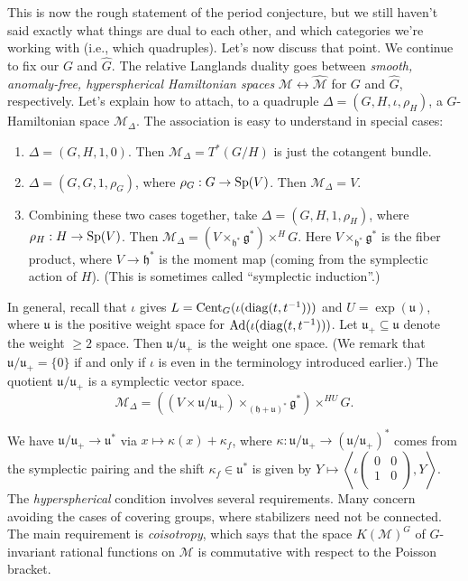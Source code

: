 \documentclass[reqno]{amsart} 
\numberwithin{theorem}{section}
\numberwithin{equation}{section}
\numberwithin{exercise}{section}
\begin{document}
This is now the rough statement of the period conjecture, but we still haven't said exactly what things are dual to each other, and which categories we're working with (i.e., which quadruples).  Let's now discuss that point.  We continue to fix our $G$ and $\hat{G}$.  The relative Langlands duality goes between \emph{smooth, anomaly-free, hyperspherical Hamiltonian spaces} $\mathcal{M} \leftrightarrow \hat{\mathcal{M}}$ for $G$ and $\hat{G}$, respectively.  Let's explain how to attach, to a quadruple $\Delta =(G, H, \iota, \rho_H)$, a $G$-Hamiltonian space $\mathcal{M}_\Delta$.  The association is easy to understand in special cases:
\begin{enumerate}
\item $\Delta =(G, H, 1, 0)$.  Then $\mathcal{M}_\Delta = T^\ast(G / H)$ is just the cotangent bundle.
\item $\Delta =(G, G, 1, \rho_G)$, where $\rho_G : G \rightarrow \operatorname{Sp}(V)$.  Then $\mathcal{M}_\Delta = V$.
\item Combining these two cases together, take $\Delta =(G, H, 1, \rho_H)$, where $\rho_H : H \rightarrow \operatorname{Sp}(V)$.  Then $\mathcal{M}_\Delta =(V \times_{\mathfrak{h}^\ast} \mathfrak{g}^\ast) \times^H G$.  Here $V \times_{\mathfrak{h}^\ast} \mathfrak{g}^\ast$ is the fiber product, where $V \rightarrow \mathfrak{h}^\ast$ is the moment map (coming from the symplectic action of $H$).  (This is sometimes called ``symplectic induction''.)
\end{enumerate}
In general, recall that $\iota$ gives $L = \operatorname{Cent}_G(\iota(\operatorname{diag}(t, t^{-1})))$ and $U = \exp(\mathfrak{u})$, where $\mathfrak{u}$ is the positive weight space for $\operatorname{Ad}(\iota(\operatorname{diag}(t, t^{-1})))$.  Let $\mathfrak{u}_+ \subseteq \mathfrak{u}$ denote the weight $\geq 2$ space.  Then $\mathfrak{u} / \mathfrak{u}_+$ is the weight one space.  (We remark that $\mathfrak{u} / \mathfrak{u}_+ = \{0\}$ if and only if $\iota$ is even in the terminology introduced earlier.)  The quotient $\mathfrak{u} / \mathfrak{u}_+$ is a symplectic vector space.
\begin{equation*}
  \mathcal{M}_\Delta = \left(
    (V \times \mathfrak{u} / \mathfrak{u}_+)
    \times_{(\mathfrak{h} + \mathfrak{u})^\ast}
    \mathfrak{g}^\ast\right)
  \times^{H U}
  G.
\end{equation*}

We have $\mathfrak{u} / \mathfrak{u}_+ \rightarrow \mathfrak{u}^\ast$ via $x \mapsto \kappa(x) + \kappa_f$, where $\kappa : \mathfrak{u} / \mathfrak{u}_+ \rightarrow(\mathfrak{u} / \mathfrak{u}_+)^\ast$ comes from the symplectic pairing
and the shift $\kappa_f \in \mathfrak{u}^\ast$ is given by $Y \mapsto \left\langle \iota \left(
    \begin{smallmatrix}
      0&0\\
      1&0 \\
    \end{smallmatrix}
  \right), Y \right\rangle$.  The \emph{hyperspherical} condition involves several requirements.  Many concern avoiding the cases of covering groups, where stabilizers need not be connected.  The main requirement is \emph{coisotropy}, which says that the space $K(\mathcal{M})^G$ of $G$-invariant rational functions on $\mathcal{M}$ is commutative with respect to the Poisson bracket.
\end{document}
